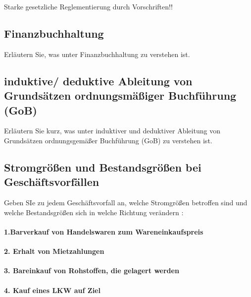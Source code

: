 \documentclass[paper=a4, fontsize=11pt]{scrartcl}
\numberwithin{equation}{section}
\numberwithin{figure}{section}
\numberwithin{table}{section}
\begin{document}
Starke gesetzliche Reglementierung durch Vorschriften!!


\subsection{Finanzbuchhaltung}

Erläutern Sie, was unter Finanzbuchhaltung zu verstehen ist. \\


\subsection{induktive/ deduktive Ableitung von Grundsätzen ordnungsmäßiger Buchführung (GoB)}

Erläutern Sie kurz, was unter induktiver und deduktiver Ableitung von Grundsätzen ordnungsgemäßer Buchführung (GoB) zu verstehen ist. \\


\subsection{Stromgrößen und Bestandsgrößen bei Geschäftsvorfällen}

Geben SIe zu jedem Geschäftsvorfall an, welche Stromgrößen betroffen sind und welche Bestandsgrößen sich in welche Richtung verändern : \\

\paragraph{1.Barverkauf von Handelswaren zum Wareneinkaufspreis}

\paragraph{2. Erhalt von Mietzahlungen}

\paragraph{3. Bareinkauf von Rohstoffen, die gelagert werden}

\paragraph{4. Kauf eines LKW auf Ziel}
\end{document}
